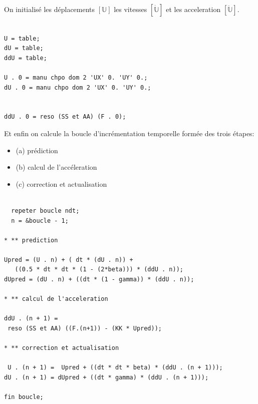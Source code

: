  
\begin{castemcom}
On initialisé les déplacements $[\mathbb{U}]$
les vitesses $[\dot{\mathbb{U}}]$ et les 
acceleration $[\ddot{\mathbb{U}}]$.  
\end{castemcom}
\begin{castemlines}
\begin{verbatim}

U = table; 
dU = table; 
ddU = table; 

U . 0 = manu chpo dom 2 'UX' 0. 'UY' 0.;
dU . 0 = manu chpo dom 2 'UX' 0. 'UY' 0.;

   
ddU . 0 = reso (SS et AA) (F . 0); 

\end{verbatim}
\end{castemlines}

 
\begin{castemcom}
Et enfin on calcule la boucle d'incrémentation temporelle 
formée des trois étapes:
\begin{itemize}
  \item{(a)} prédiction 
  \item{(b)} calcul de l'accéleration 
  \item{(c)} correction et actualisation  
\end{itemize}
\end{castemcom}
\begin{castemlines}
\begin{verbatim}

  repeter boucle ndt; 
  n = &boucle - 1;
 
* ** prediction 

Upred = (U . n) + ( dt * (dU . n)) + 
   ((0.5 * dt * dt * (1 - (2*beta))) * (ddU . n)); 
dUpred = (dU . n) + ((dt * (1 - gamma)) * (ddU . n));

* ** calcul de l'acceleration 

ddU . (n + 1) = 
 reso (SS et AA) ((F.(n+1)) - (KK * Upred)); 

* ** correction et actualisation 

 U . (n + 1) =  Upred + ((dt * dt * beta) * (ddU . (n + 1)));
dU . (n + 1) = dUpred + ((dt * gamma) * (ddU . (n + 1)));

fin boucle;  

\end{verbatim}
\end{castemlines}



\begin{castemcom}


\end{castemcom}
\begin{castemlines}
\begin{verbatim}


\end{verbatim}
\end{castemlines}

